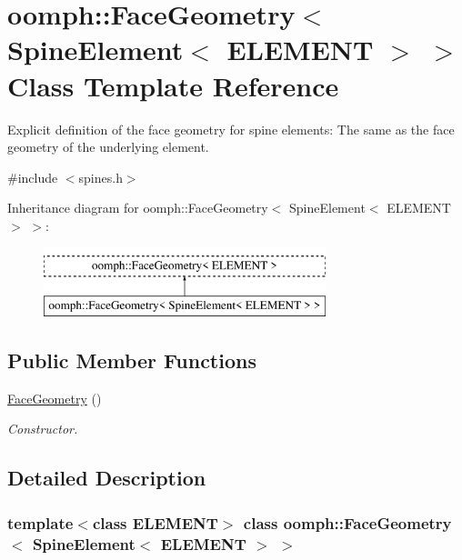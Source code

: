 \hypertarget{classoomph_1_1FaceGeometry_3_01SpineElement_3_01ELEMENT_01_4_01_4}{}\section{oomph\+:\+:Face\+Geometry$<$ Spine\+Element$<$ E\+L\+E\+M\+E\+NT $>$ $>$ Class Template Reference}
\label{classoomph_1_1FaceGeometry_3_01SpineElement_3_01ELEMENT_01_4_01_4}


Explicit definition of the face geometry for spine elements\+: The same as the face geometry of the underlying element.  




{\ttfamily \#include $<$spines.\+h$>$}

Inheritance diagram for oomph\+:\+:Face\+Geometry$<$ Spine\+Element$<$ E\+L\+E\+M\+E\+NT $>$ $>$\+:\begin{figure}[H]
\begin{center}
\leavevmode
\includegraphics[height=2.000000cm]{classoomph_1_1FaceGeometry_3_01SpineElement_3_01ELEMENT_01_4_01_4}
\end{center}
\end{figure}
\subsection*{Public Member Functions}
\begin{DoxyCompactItemize}
\item 
\hyperlink{classoomph_1_1FaceGeometry_3_01SpineElement_3_01ELEMENT_01_4_01_4_afe210062a83fdbdb5d729afc3460ef9d}{Face\+Geometry} ()
\begin{DoxyCompactList}\small\item\em Constructor. \end{DoxyCompactList}\end{DoxyCompactItemize}


\subsection{Detailed Description}
\subsubsection*{template$<$class E\+L\+E\+M\+E\+NT$>$\newline
class oomph\+::\+Face\+Geometry$<$ Spine\+Element$<$ E\+L\+E\+M\+E\+N\+T $>$ $>$}

